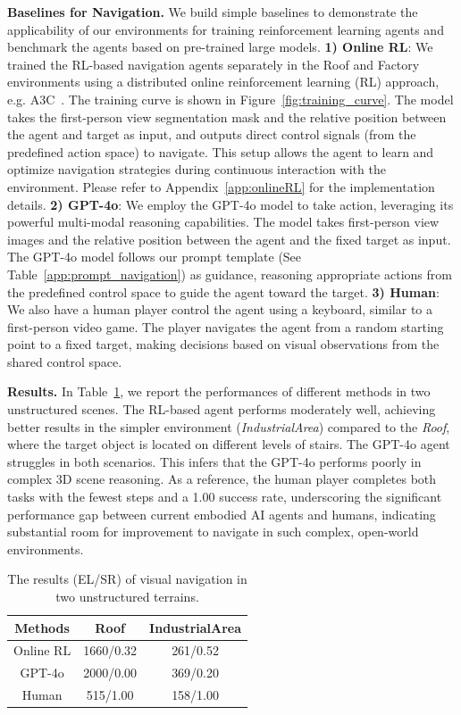 \documentclass{article}
\begin{document}
\textbf{Baselines for Navigation.} We build simple baselines to demonstrate the applicability of our environments for training reinforcement learning agents and benchmark the agents based on pre-trained large models.
\textbf{1) Online RL}: We trained the RL-based navigation agents separately in the Roof and Factory environments using a distributed online reinforcement learning (RL) approach, e.g. A3C~\citep{mnih2016asynchronous}. The training curve is shown in Figure~\ref{fig:training_curve}. The model takes the first-person view segmentation mask and the relative position between the agent and target as input, and outputs direct control signals (from the predefined action space) to navigate. This setup allows the agent to learn and optimize navigation strategies during continuous interaction with the environment. Please refer to Appendix~\ref{app:onlineRL} for the implementation details.
\textbf{2) GPT-4o}: We employ the GPT-4o model to take action, leveraging its powerful multi-modal reasoning capabilities. The model takes first-person view images and the relative position between the agent and the fixed target as input. The GPT-4o model follows our prompt template (See Table~\ref{app:prompt_navigation}) as guidance, reasoning appropriate actions from the predefined control space to guide the agent toward the target.
\textbf{3) Human}: We also have a human player control the agent using a keyboard, similar to a first-person video game. The player navigates the agent from a random starting point to a fixed target, making decisions based on visual observations from the shared control space.

\textbf{Results.}
In Table~\ref{tab:nav_res}, we report the performances of different methods in two unstructured scenes. The RL-based agent performs moderately well, achieving better results in the simpler environment (\emph{IndustrialArea}) compared to the \emph{Roof}, where the target object is located on different levels of stairs. The GPT-4o agent struggles in both scenarios. This infers that the GPT-4o performs poorly in complex 3D scene reasoning. As a reference, the human player completes both tasks with the fewest steps and a 1.00 success rate, underscoring the significant performance gap between current embodied AI agents and humans, indicating substantial room for improvement to navigate in such complex, open-world environments.

\begin{table}
\vspace{-0.2cm}
\centering
\caption{The results (EL/SR) of visual navigation in two unstructured terrains. }
\begin{tabular}{c|cc}
\hline
\bf Methods & \bf Roof & \bf IndustrialArea \\  
\hline 
Online RL & 1660/0.32 & 261/0.52 \\  
GPT-4o & 2000/0.00 & 369/0.20 \\  
\hline
Human & 515/1.00 & 158/1.00 \\  
\hline
\end{tabular}
\label{tab:nav_res}
\end{table}
\end{document}
